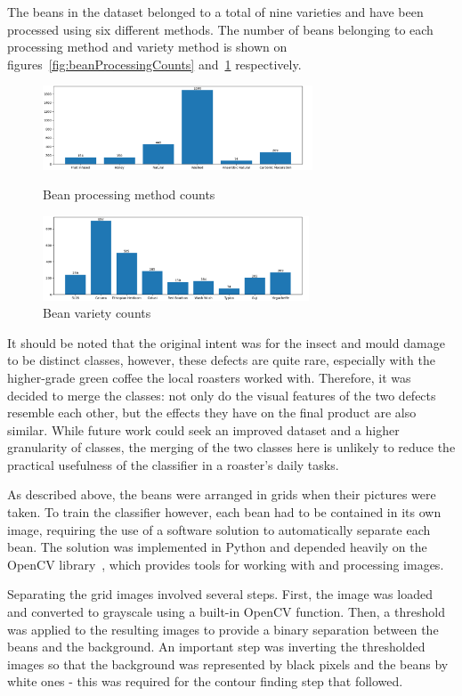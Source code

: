 The beans in the dataset belonged to a total of nine varieties and have been processed using six different methods.
The number of beans belonging to each processing method and variety method is shown
on figures~\ref{fig:beanProcessingCounts} and~\ref{fig:beanVarietyCounts} respectively.
\begin{figure}[h]
    \centering
    \includegraphics[width=\linewidth, height=2.5cm, keepaspectratio]{
        ./figures/methodology/processing-counts
    }
    \caption{Bean processing method counts}
    \label{fig:beanProcessingCounts}

    \includegraphics[width=\linewidth, height=2.5cm, keepaspectratio]{
        ./figures/methodology/variety-counts
    }
    \caption{Bean variety counts}
    \label{fig:beanVarietyCounts}
\end{figure}

It should be noted that the original intent was for the insect and mould damage to be distinct classes,
however, these defects are quite rare, especially with the higher-grade green coffee the local roasters worked with.
Therefore, it was decided to merge the classes: not only do the visual features of the two
defects resemble each other, but the effects they have on the final product are also similar.
While future work could seek an improved dataset and a higher granularity of classes, the merging of the two classes here
is unlikely to reduce the practical usefulness of the classifier in a roaster's daily tasks.

As described above, the beans were arranged in grids when their pictures were taken.
To train the classifier however, each bean had to be contained in its own image, requiring the use of a software solution
to automatically separate each bean.
The solution was implemented in Python and depended heavily on the OpenCV library~\cite{opencvLibrary}, which provides
tools for working with and processing images.

Separating the grid images involved several steps.
First, the image was loaded and converted to grayscale using a built-in OpenCV function.
Then, a threshold was applied to the resulting images to provide a binary separation between the beans and the background.
An important step was inverting the thresholded images so that the background was represented by black pixels
and the beans by white ones - this was required for the contour finding step that followed.

